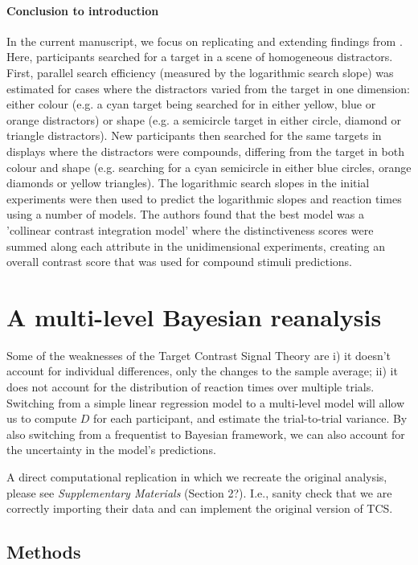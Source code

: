 \documentclass[smallextended]{svjour3}       %
\begin{document}
\paragraph{Conclusion to introduction} 
In the current manuscript, we focus on replicating and extending findings from \cite{buetti2019predicting}. Here, participants searched for a target in a scene of homogeneous distractors. First, parallel search efficiency (measured by the logarithmic search slope) was estimated for cases where the distractors varied from the target in one dimension: either colour (e.g. a cyan target being searched for in either yellow, blue or orange distractors) or shape (e.g. a semicircle target in either circle, diamond or triangle distractors). New participants then searched for the same targets in displays where the distractors were compounds, differing from the target in both colour and shape (e.g. searching for a cyan semicircle in either blue circles, orange diamonds or yellow triangles). The logarithmic search slopes in the initial experiments were then used to predict the logarithmic slopes and reaction times using a number of models. The authors found that the best model was a 'collinear contrast integration model' where the distinctiveness scores were summed along each attribute in the unidimensional experiments, creating an overall contrast score that was used for compound stimuli predictions.

\section{A multi-level Bayesian reanalysis}
\label{sec:reanalysis}

Some of the weaknesses of the Target Contrast Signal Theory are i) it doesn't account for individual differences, only the changes to the sample average;  ii) it does not account for the distribution of reaction times over multiple trials. Switching from a simple linear regression model to a multi-level model will allow us to compute $D$ for each participant, and estimate the trial-to-trial variance. By also switching from a frequentist to Bayesian framework, we can also account for the uncertainty in the model's predictions. 

A direct computational replication in which we recreate the original analysis, please see \textit{Supplementary Materials} (Section 2?). I.e., sanity check that we are correctly importing their data and can implement the original version of TCS.

\subsection{Methods}
\end{document}
